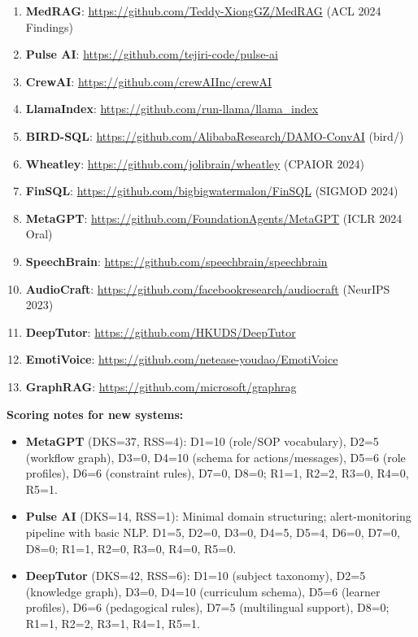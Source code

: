 \documentclass[10pt,a4paper]{article}
\begin{document}
\begin{enumerate}
\item \textbf{MedRAG}: \url{https://github.com/Teddy-XiongGZ/MedRAG} (ACL 2024 Findings)
\item \textbf{Pulse AI}: \url{https://github.com/tejiri-code/pulse-ai}
\item \textbf{CrewAI}: \url{https://github.com/crewAIInc/crewAI}
\item \textbf{LlamaIndex}: \url{https://github.com/run-llama/llama_index}
\item \textbf{BIRD-SQL}: \url{https://github.com/AlibabaResearch/DAMO-ConvAI} (bird/)
\item \textbf{Wheatley}: \url{https://github.com/jolibrain/wheatley} (CPAIOR 2024)
\item \textbf{FinSQL}: \url{https://github.com/bigbigwatermalon/FinSQL} (SIGMOD 2024)
\item \textbf{MetaGPT}: \url{https://github.com/FoundationAgents/MetaGPT} (ICLR 2024 Oral)
\item \textbf{SpeechBrain}: \url{https://github.com/speechbrain/speechbrain}
\item \textbf{AudioCraft}: \url{https://github.com/facebookresearch/audiocraft} (NeurIPS 2023)
\item \textbf{DeepTutor}: \url{https://github.com/HKUDS/DeepTutor}
\item \textbf{EmotiVoice}: \url{https://github.com/netease-youdao/EmotiVoice}
\item \textbf{GraphRAG}: \url{https://github.com/microsoft/graphrag}
\end{enumerate}

\noindent\textbf{Scoring notes for new systems:}
\begin{itemize}[nosep]
\item \textbf{MetaGPT} (DKS=37, RSS=4): D1=10 (role/SOP vocabulary), D2=5 (workflow graph), D3=0, D4=10 (schema for actions/messages), D5=6 (role profiles), D6=6 (constraint rules), D7=0, D8=0; R1=1, R2=2, R3=0, R4=0, R5=1.
\item \textbf{Pulse AI} (DKS=14, RSS=1): Minimal domain structuring; alert-monitoring pipeline with basic NLP. D1=5, D2=0, D3=0, D4=5, D5=4, D6=0, D7=0, D8=0; R1=1, R2=0, R3=0, R4=0, R5=0.
\item \textbf{DeepTutor} (DKS=42, RSS=6): D1=10 (subject taxonomy), D2=5 (knowledge graph), D3=0, D4=10 (curriculum schema), D5=6 (learner profiles), D6=6 (pedagogical rules), D7=5 (multilingual support), D8=0; R1=1, R2=2, R3=1, R4=1, R5=1.
\end{itemize}
\end{document}
